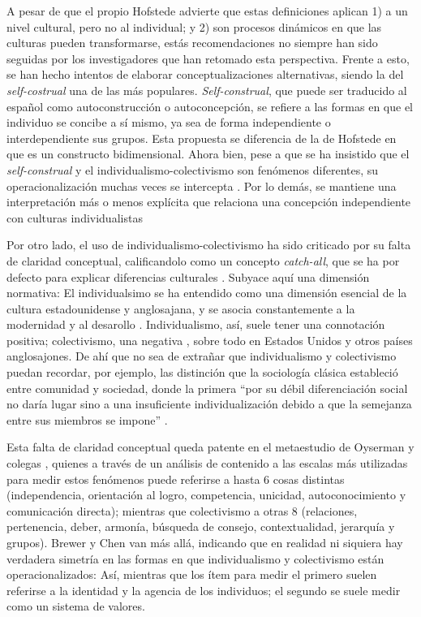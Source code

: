 \documentclass[12pt,twoside]{templates/facsothesis}
\begin{document}
A pesar de que el propio Hofstede advierte que estas definiciones aplican 1) a un nivel cultural, pero no al individual; y 2) son procesos dinámicos en que las culturas pueden transformarse, estás recomendaciones no siempre han sido seguidas por los investigadores que han retomado esta perspectiva. Frente a esto, se han hecho intentos de elaborar conceptualizaciones alternativas, siendo la del \emph{self-costrual} \citep{cross2011} una de las más populares. \emph{Self-construal}, que puede ser traducido al español como autoconstrucción o autoconcepción, se refiere a las formas en que el individuo se concibe a sí mismo, ya sea de forma independiente o interdependiente sus grupos. Esta propuesta se diferencia de la de Hofstede en que es un constructo bidimensional. Ahora bien, pese a que se ha insistido que el \emph{self-construal} y el individualismo-colectivismo son fenómenos diferentes, su operacionalización muchas veces se intercepta \citep{cross2011}. Por lo demás, se mantiene una interpretación más o menos explícita que relaciona una concepción independiente con culturas individualistas \citep{cross2011, voronov2002}

Por otro lado, el uso de individualismo-colectivismo ha sido criticado por su falta de claridad conceptual, calificandolo como un concepto \emph{catch-all}, que se ha por defecto para explicar diferencias culturales \citep{voronov2002}. Subyace aquí una dimensión normativa: El individualsimo se ha entendido como una dimensión esencial de la cultura estadounidense y anglosajana, y se asocia constantemente a la modernidad y al desarollo \citep{voronov2002, wang2010}. Individualismo, así, suele tener una connotación positiva; colectivismo, una negativa \citep{moemeka1998}, sobre todo en Estados Unidos y otros países anglosajones. De ahí que no sea de extrañar que individualismo y colectivismo puedan recordar, por ejemplo, las distinción que la sociología clásica estableció entre comunidad y sociedad, donde la primera ``por su débil diferenciación social no daría lugar sino a una insuficiente individualización debido a que la semejanza entre sus miembros se impone'' \citep[Segundo relato: Insuficiencias y anomalías, párrafo 2]{martuccelli2010}.

Esta falta de claridad conceptual queda patente en el metaestudio de Oyserman y colegas \citeyearpar{oyserman2002}, quienes a través de un análisis de contenido a las escalas más utilizadas para medir estos fenómenos puede referirse a hasta 6 cosas distintas (independencia, orientación al logro, competencia, unicidad, autoconocimiento y comunicación directa); mientras que colectivismo a otras 8 (relaciones, pertenencia, deber, armonía, búsqueda de consejo, contextualidad, jerarquía y grupos). Brewer y Chen \citeyearpar{brewer2007} van más allá, indicando que en realidad ni siquiera hay verdadera simetría en las formas en que individualismo y colectivismo están operacionalizados: Así, mientras que los ítem para medir el primero suelen referirse a la identidad y la agencia de los individuos; el segundo se suele medir como un sistema de valores.
\end{document}
